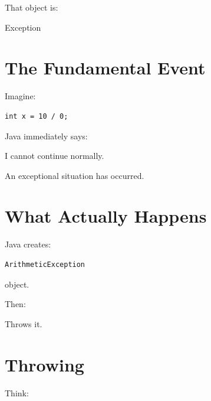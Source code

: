 \documentclass[11pt,a4paper]{book}
\begin{document}
That object is:


Exception


\section{The Fundamental Event}

Imagine:

\begin{verbatim} 
int x = 10 / 0;
\end{verbatim}


Java immediately says:


I cannot continue normally.


An exceptional situation
has occurred.


\section{What Actually Happens}

Java creates:

\begin{verbatim} 
ArithmeticException
\end{verbatim}

object.


Then:


Throws it.


\section{Throwing}

Think:

\end{document}
